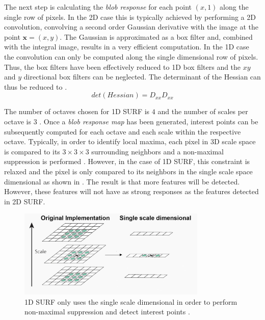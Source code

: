 The next step is calculating the \textit{blob response} for each point $(x,1)$ along the single row of pixels. In the 2D case this is typically achieved by performing a 2D convolution, convolving a second order Gaussian derivative with the image at the point $\textbf{x} = (x,y)$. The Gaussian is approximated as a box filter and, combined with the integral image, results in a very efficient computation. In the 1D case the convolution can only be computed along the single dimensional row of pixels. Thus, the box filters have been effectively reduced to 1D box filters and the $xy$ and $y$ directional box filters can be neglected. The determinant of the Hessian can thus be reduced to  \cite{Anderson}.\\

\begin{equation}
det(Hessian) = D_{xx}D_{xx}
\label{eqn:reducedHessian}
\end{equation} 

The number of octaves chosen for 1D SURF is $4$ and the number of scales per octave is $3$ \cite{Anderson}. Once a \textit{blob response map} has been generated, interest points can be subsequently computed for each octave and each scale within the respective octave. Typically, in order to identify local maxima, each pixel in 3D scale space is compared to its $3 \times 3 \times 3$ surrounding neighbors and a non-maximal suppression is performed \citep{Evans2009}. However, in the case of 1D SURF, this constraint is relaxed and the pixel is only compared to its neighbors in the single scale space dimensional as shown in . The result is that more features will be detected. However, these features will not have as strong responses as the features detected in 2D SURF.\\

\begin{figure}[h!] 
  \centering
    \includegraphics[width=0.8\textwidth]{../Drawings/methods/SURF1D_Nonmaximal_suppression.jpg}
    \caption{1D SURF only uses the single scale dimensional in order to perform non-maximal suppression and detect interest points \citep{Anderson}.}
    \label{fig:singleScale}
\end{figure}


